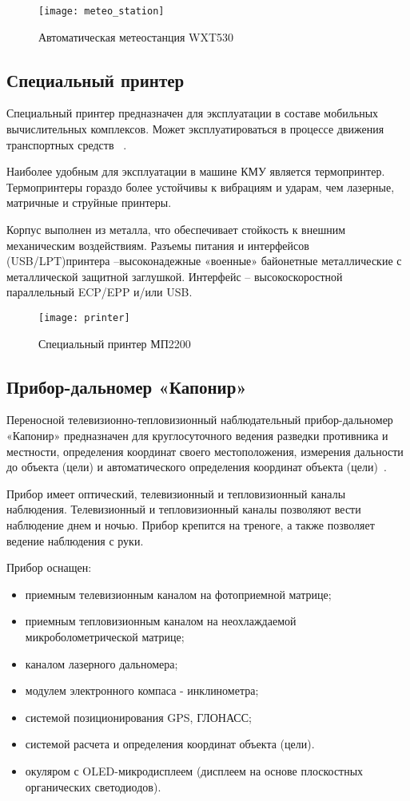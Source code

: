 \begin{figure}
	\centering
	\texttt{[image: meteo\_station]}
	\caption{Автоматическая метеостанция WXT530~\cite{wxt530}}
	\label{fig:lit_reiview:meteo:meteo_station}
\end{figure}

\subsection{Специальный принтер}
\label{sub:lit_review:spec_printer}
Специальный принтер предназначен для эксплуатации в составе мобильных вычислительных комплексов.
Может эксплуатироваться в процессе движения транспортных средств ~\cite{mp2200}.

Наиболее удобным для эксплуатации в машине КМУ является термопринтер. Термопринтеры гораздо более устойчивы к вибрациям и ударам, чем лазерные, матричные и струйные принтеры.

Корпус выполнен из металла, что обеспечивает стойкость к внешним механическим воздействиям.
Разъемы питания и интерфейсов (USB/LPT)\break принтера –высоконадежные «военные» байонетные металлические с металлической защитной заглушкой.
Интерфейс – высокоскоростной параллельный ECP/EPP и/или USB.

\begin{figure}
	\centering
	\texttt{[image: printer]}
	\caption{Специальный принтер МП2200~\cite{mp2200}}
	\label{fig:lit_reiview:spec_printer:printer}
\end{figure}

\subsection{Прибор-дальномер «Капонир»}
\label{sub:lit_review:kaponir}
Переносной телевизионно-тепловизионный наблюдательный прибор-дальномер «Капонир» предназначен для круглосуточного
ведения разведки противника и местности, определения координат своего местоположения, измерения дальности до объекта
(цели) и автоматического определения координат объекта (цели)~\cite{kaponir}.

Прибор имеет оптический, телевизионный и тепловизионный каналы наблюдения. Телевизионный и тепловизионный каналы позволяют
вести наблюдение днем и ночью. Прибор  крепится на треноге, а также  позволяет ведение наблюдения с руки.

Прибор оснащен:
\begin{itemize}
	\item приемным телевизионным каналом на фотоприемной матрице;
	\item приемным тепловизионным каналом на неохлаждаемой микроболометрической матрице;
	\item каналом лазерного дальномера;
	\item модулем электронного компаса - инклинометра;
	\item системой позиционирования GPS, ГЛОНАСС;
	\item системой расчета и определения координат объекта (цели).
	\item окуляром с OLED-микродисплеем (дисплеем на основе плоскостных органических светодиодов).
\end{itemize}

